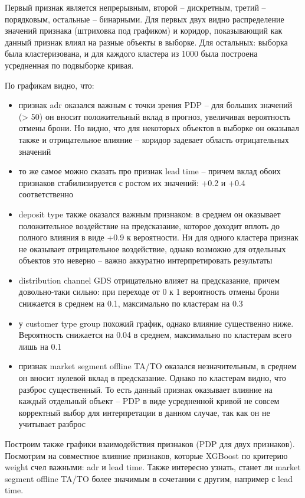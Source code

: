 Первый признак является непрерывным, второй --  дискретным, третий -- порядковым, остальные -- бинарными. Для первых двух видно распределение значений признака (штриховка под графиком) и коридор, показывающий как данный признак влиял на разные объекты в выборке. Для остальных: выборка была кластеризована, и для каждого кластера из 1000 была построена усредненная по подвыборке кривая.

По графикам видно, что:
\begin{itemize}
	\item признак adr оказался важным с точки зрения PDP -- для больших значений (> 50) он вносит положительный вклад в прогноз, увеличивая вероятность отмены брони. Но видно, что для некоторых объектов в выборке он оказывал также и отрицательное влияние -- коридор задевает область отрицательных значений
	\item то же самое можно сказать про признак lead time -- причем вклад обоих признаков стабилизируется с ростом их значений: +0.2 и +0.4 соответственно
	\item deposit type также оказался важным признаком: в среднем он оказывает положительное воздействие на предсказание, которое доходит вплоть до полного влияния в виде +0.9 к вероятности. Ни для одного кластера признак не оказывает отрицательное воздействие, однако возможно для отдельных объектов это неверно -- важно аккуратно интерпретировать результаты
	\item distribution channel GDS отрицательно влияет на предсказание, причем довольно-таки сильно: при переходе от 0 к 1 вероятность отмены брони снижается в среднем на 0.1, максимально по кластерам на 0.3
	\item у customer type group похожий график, однако влияние существенно ниже. Вероятность снижается на 0.04 в среднем, максимально по кластерам всего лишь на 0.1
	\item признак market segment offline TA/TO оказался незначительным, в среднем он вносит нулевой вклад в предсказание. Однако по кластерам видно, что разброс существенный. То есть данный признак оказывает влияние на каждый отдельный объект -- PDP в виде усредненной кривой не совсем корректный выбор для интерпретации в данном случае, так как он не учитывает разброс
\end{itemize}

Построим также графики взаимодействия признаков (PDP для двух признаков). Посмотрим на совместное влияние признаков, которые XGBoost по критерию weight счел важными: adr и lead time. Также интересно узнать, станет ли market segment offline TA/TO более значимым в сочетании с другим, например с lead time.

